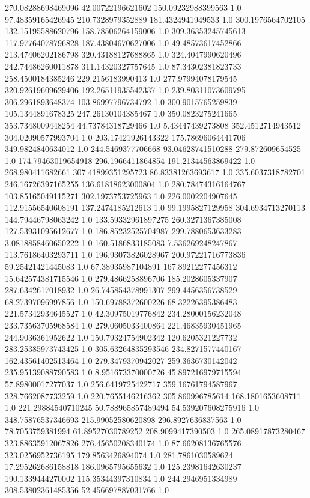 270.08288698469096	42.00722196621602	150.09232988399563	1.0
97.48359165426945	210.7328979352889	181.4324941949533	1.0
300.1976564702105	132.15195588620796	158.78506264159006	1.0
309.36353245745613	117.97764078796828	187.43804670627006	1.0
49.48573617452866	213.47406202186798	320.43188127688865	1.0
324.4047990620496	242.74486260011878	311.14320327757645	1.0
87.34302381823733	258.4500184385246	229.2156183990413	1.0
277.97994078179545	320.92619609629406	192.26511935542337	1.0
239.80311073609795	306.2961893648374	103.86997796734792	1.0
300.9015765259839	105.1344891678325	247.26130104385467	1.0
350.0823275241665	353.7348009448254	44.73784318729466	1.0
5.43447439273808	352.4512714943512	304.02090577993704	1.0
203.17421926143322	175.78696064441706	349.9824840634012	1.0
244.5469377706668	93.04628741510288	279.872609654525	1.0
174.79463019654918	296.1966411864854	191.21344563869422	1.0
268.980411682661	307.41899351295723	86.83381263693617	1.0
335.6037318782701	246.16726397165255	136.61818623000804	1.0
280.78474316164767	103.85165049115271	302.1973753725963	1.0
226.0002204907645	112.91556540608191	137.2474185212613	1.0
99.1995827129958	304.6934713270113	144.79446798063242	1.0
133.59332961897275	260.3271367385008	127.53931095612677	1.0
186.85232525704987	299.7880653633283	3.0818858460650222	1.0
160.5186833185083	7.536269248247867	113.76186403293711	1.0
196.93073826028967	200.97221716773836	59.25421421445083	1.0
67.38935987104891	167.89212277456312	15.642574381715546	1.0
279.4866258896706	185.2028605337907	287.6342617018932	1.0
26.745854378991307	299.4456356738529	68.27397096997856	1.0
150.69788372600226	68.32226395386483	221.57342934645527	1.0
42.30975019776842	234.28000156232048	233.73563705968584	1.0
279.0605033400864	221.46835930451965	244.9036361952622	1.0
150.79324754902342	120.6205321227732	283.25385973743425	1.0
305.63264835293546	234.8271577440167	162.43561402513464	1.0
279.3479370942027	259.3636730142042	235.95139088790583	1.0
8.951673370000726	45.897216979715594	57.89800017277037	1.0
256.6419725422717	359.16761794587967	328.7662087733259	1.0
220.7655146216362	305.860996785614	168.1801653608711	1.0
221.29884540710245	50.788965857489494	54.539207608275916	1.0
348.75876537346693	215.99052580620898	296.8927636837563	1.0
78.7053759381994	61.89527030789252	208.9099417390503	1.0
265.08917873280467	323.88635912067826	276.45650208340174	1.0
87.66208136765576	323.0256952736195	179.8563426894074	1.0
281.7861030589624	17.295262686158818	186.0965795655632	1.0
125.23981642630237	190.1339444270002	115.35344397310834	1.0
244.2946951334989	308.53802361485356	52.456697887031766	1.0
